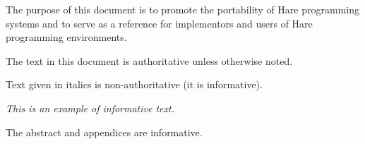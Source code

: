 
\specitem
The purpose of this document is to promote the portability of Hare programming
systems and to serve as a reference for implementors and users of Hare
programming environments.

\specitem
The text in this document is authoritative unless otherwise noted.

\specitem
Text given in italics is non-authoritative (it is informative).

\specsubitem
\textit{This is an example of informative text.}

\specitem
The abstract and appendices are informative.
